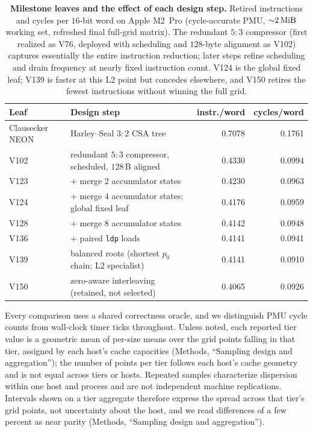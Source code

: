 \documentclass[fleqn,10pt]{wlscirep}
\begin{document}
\begin{table}[!t]\centering
\caption{\label{tab:leaves}\textbf{Milestone leaves and the effect of each design step.} Retired instructions and cycles per $16$-bit word on Apple M2~Pro (cycle-accurate PMU, ${\sim}\SI{2}{\mebi\byte}$ working set, refreshed final full-grid matrix). The redundant $5{:}3$ compressor (first realized as V76, deployed with scheduling and $128$-byte alignment as V102) captures essentially the entire instruction reduction; later steps refine scheduling and drain frequency at nearly fixed instruction count. V124 is the global fixed leaf; V139 is faster at this L2 point but concedes elsewhere, and V150 retires the fewest instructions without winning the full grid.}
\begin{tabular}{@{}l l | r r@{}}
\toprule
Leaf & Design step & instr./word & cycles/word\\
\midrule
Clausecker NEON & Harley--Seal $3{:}2$ CSA tree & 0.7078 & 0.1761\\
V102 & redundant $5{:}3$ compressor, scheduled, $128$\,B aligned & 0.4330 & 0.0994\\
V123 & \quad{}+ merge $2$ accumulator states & 0.4230 & 0.0963\\
V124 & \quad{}+ merge $4$ accumulator states; global fixed leaf & 0.4176 & 0.0959\\
V128 & \quad{}+ merge $8$ accumulator states & 0.4142 & 0.0948\\
V136 & \quad{}+ paired \texttt{ldp} loads & 0.4141 & 0.0941\\
V139 & balanced roots (shortest $p_0$ chain; L2 specialist) & 0.4141 & 0.0910\\
V150 & zero-aware interleaving (retained, not selected) & 0.4065 & 0.0926\\
\bottomrule
\end{tabular}
\end{table}

Every comparison uses a shared correctness oracle, and we distinguish PMU cycle counts from wall-clock timer ticks throughout. Unless noted, each reported tier value is a geometric mean of per-size means over the grid points falling in that tier, assigned by each host's cache capacities (Methods, ``Sampling design and aggregation''); the number of points per tier follows each host's cache geometry and is not equal across tiers or hosts. Repeated samples characterize dispersion within one host and process and are not independent machine replications. Intervals shown on a tier aggregate therefore express the spread across that tier's grid points, not uncertainty about the host, and we read differences of a few percent as near parity (Methods, ``Sampling design and aggregation'').
\end{document}
